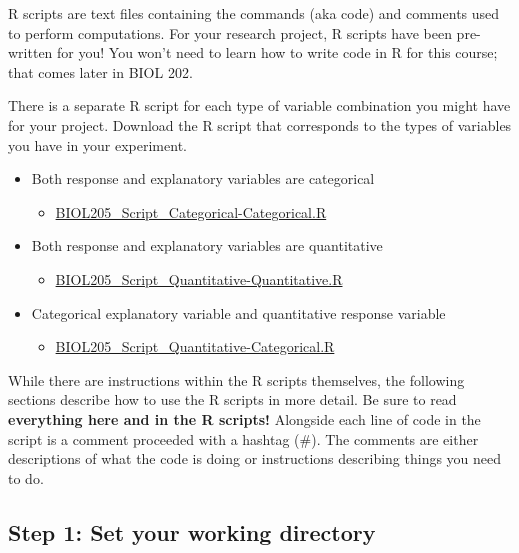 \documentclass[
]{book}
\providecommand{\tightlist}{%
  \setlength{\itemsep}{0pt}\setlength{\parskip}{0pt}}
\begin{document}
R scripts are text files containing the commands (aka code) and comments used to perform computations. For your research project, R scripts have been pre-written for you! You won't need to learn how to write code in R for this course; that comes later in BIOL 202.

There is a separate R script for each type of variable combination you might have for your project. Download the R script that corresponds to the types of variables you have in your experiment.

\begin{itemize}
\tightlist
\item
  Both response and explanatory variables are categorical

  \begin{itemize}
  \tightlist
  \item
    \href{https://osf.io/download/sg7y6}{BIOL205\_Script\_Categorical-Categorical.R}
  \end{itemize}
\item
  Both response and explanatory variables are quantitative

  \begin{itemize}
  \tightlist
  \item
    \href{https://osf.io/download/adwg4}{BIOL205\_Script\_Quantitative-Quantitative.R}
  \end{itemize}
\item
  Categorical explanatory variable and quantitative response variable

  \begin{itemize}
  \tightlist
  \item
    \href{https://osf.io/download/46mpk}{BIOL205\_Script\_Quantitative-Categorical.R}
  \end{itemize}
\end{itemize}

While there are instructions within the R scripts themselves, the following sections describe how to use the R scripts in more detail. Be sure to read \textbf{everything here and in the R scripts!} Alongside each line of code in the script is a comment proceeded with a hashtag (\#). The comments are either descriptions of what the code is doing or instructions describing things you need to do.

\hypertarget{step-1-set-your-working-directory}{%
\subsection*{Step 1: Set your working directory}\label{step-1-set-your-working-directory}}
\end{document}
